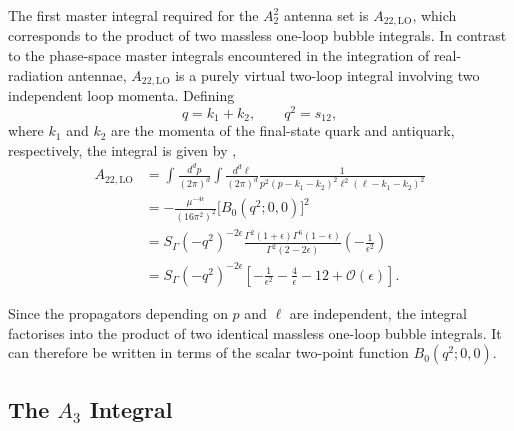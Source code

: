 The first master integral required for the $A_2^2$ antenna set is $A_{22,\mathrm{LO}}$, which corresponds
to the product of two massless one-loop bubble integrals. In contrast to the phase-space master
integrals encountered in the integration of real-radiation antennae, $A_{22,\mathrm{LO}}$ is a purely
virtual two-loop integral involving two independent loop momenta. Defining
\begin{equation*}
    q=k_1+k_2,\qquad q^2=s_{12},
\end{equation*}
where $k_1$ and $k_2$ are the momenta of the final-state quark and antiquark, respectively, the
integral is given by \cite{Gehrmann-DeRidder:2005btv},
\begin{equation}
    \begin{split}
        A_{22,\text{LO}} &= \int\frac{d^dp}{(2\pi)^d}\int\frac{d^d\ell}{(2\pi)^d}\frac1{p^2(p-k_1-k_2)^2\ell^2(\ell-k_1-k_2)^2}\\
                         &= -\frac{\mu^{-4\epsilon}}{\left(16\pi^2\right)^2}\Big[B_0\!\left(q^2;0,0\right)\Big]^2\\
                         &= S_\Gamma\!\left(-q^2\right)^{-2\epsilon}\frac{\Gamma^2(1+\epsilon)\Gamma^6(1-\epsilon)}{\Gamma^2(2-2\epsilon)}\!\left(-\frac1{\epsilon^2}\right)\\
                         &= S_\Gamma\!\left(-q^2\right)^{-2\epsilon}\!\left[-\frac1{\epsilon^2}-\frac4\epsilon-12+\mathcal O(\epsilon)\right].
    \end{split}
\end{equation}

Since the propagators depending on $p$ and $\ell$ are independent, the integral factorises into the
product of two identical massless one-loop bubble integrals. It can therefore be written in terms of
the scalar two-point function $B_0(q^2;0,0)$.

\subsection{The $A_3$ Integral}

